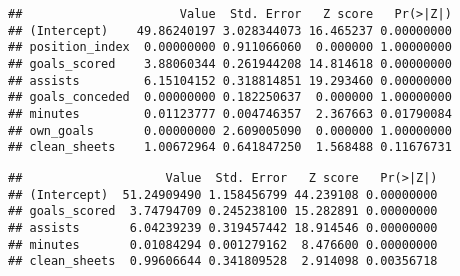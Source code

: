 \documentclass[]{article}
\newenvironment{Shaded}{\begin{snugshade}}{\end{snugshade}}
\newcommand{\DataTypeTok}[1]{\textcolor[rgb]{0.13,0.29,0.53}{#1}}
\newcommand{\DecValTok}[1]{\textcolor[rgb]{0.00,0.00,0.81}{#1}}
\newcommand{\FloatTok}[1]{\textcolor[rgb]{0.00,0.00,0.81}{#1}}
\newcommand{\KeywordTok}[1]{\textcolor[rgb]{0.13,0.29,0.53}{\textbf{#1}}}
\newcommand{\NormalTok}[1]{#1}
\newcommand{\OperatorTok}[1]{\textcolor[rgb]{0.81,0.36,0.00}{\textbf{#1}}}
\newcommand{\OtherTok}[1]{\textcolor[rgb]{0.56,0.35,0.01}{#1}}
\newcommand{\StringTok}[1]{\textcolor[rgb]{0.31,0.60,0.02}{#1}}
\begin{document}
\begin{Shaded}
\end{Shaded}

\begin{verbatim}
##                      Value  Std. Error   Z score   Pr(>|Z|)
## (Intercept)    49.86240197 3.028344073 16.465237 0.00000000
## position_index  0.00000000 0.911066060  0.000000 1.00000000
## goals_scored    3.88060344 0.261944208 14.814618 0.00000000
## assists         6.15104152 0.318814851 19.293460 0.00000000
## goals_conceded  0.00000000 0.182250637  0.000000 1.00000000
## minutes         0.01123777 0.004746357  2.367663 0.01790084
## own_goals       0.00000000 2.609005090  0.000000 1.00000000
## clean_sheets    1.00672964 0.641847250  1.568488 0.11676731
\end{verbatim}

\begin{Shaded}
\end{Shaded}

\begin{verbatim}
##                    Value  Std. Error   Z score   Pr(>|Z|)
## (Intercept)  51.24909490 1.158456799 44.239108 0.00000000
## goals_scored  3.74794709 0.245238100 15.282891 0.00000000
## assists       6.04239239 0.319457442 18.914546 0.00000000
## minutes       0.01084294 0.001279162  8.476600 0.00000000
## clean_sheets  0.99606644 0.341809528  2.914098 0.00356718
\end{verbatim}
\end{document}
